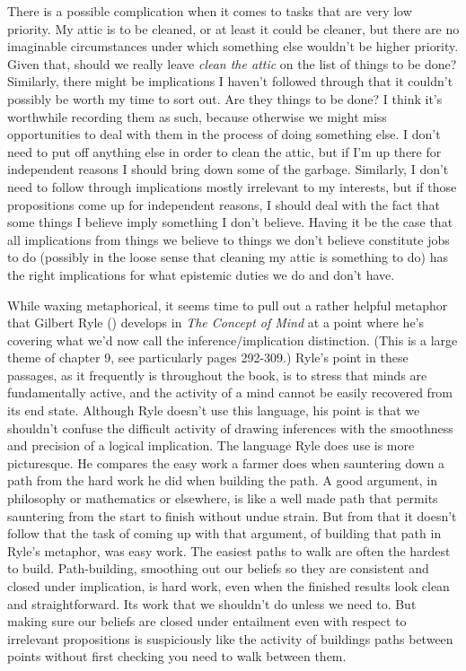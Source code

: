 \documentclass[
  11pt,
  letterpaper,
  DIV=11,
  numbers=noendperiod,
  oneside]{scrartcl}
\begin{document}
There is a possible complication when it comes to tasks that are very
low priority. My attic is to be cleaned, or at least it could be
cleaner, but there are no imaginable circumstances under which something
else wouldn't be higher priority. Given that, should we really leave
\emph{clean the attic} on the list of things to be done? Similarly,
there might be implications I haven't followed through that it couldn't
possibly be worth my time to sort out. Are they things to be done? I
think it's worthwhile recording them as such, because otherwise we might
miss opportunities to deal with them in the process of doing something
else. I don't need to put off anything else in order to clean the attic,
but if I'm up there for independent reasons I should bring down some of
the garbage. Similarly, I don't need to follow through implications
mostly irrelevant to my interests, but if those propositions come up for
independent reasons, I should deal with the fact that some things I
believe imply something I don't believe. Having it be the case that all
implications from things we believe to things we don't believe
constitute jobs to do (possibly in the loose sense that cleaning my
attic is something to do) has the right implications for what epistemic
duties we do and don't have.

While waxing metaphorical, it seems time to pull out a rather helpful
metaphor that Gilbert Ryle () develops in
\emph{The Concept of Mind} at a point where he's covering what we'd now
call the inference/implication distinction. (This is a large theme of
chapter 9, see particularly pages 292-309.) Ryle's point in these
passages, as it frequently is throughout the book, is to stress that
minds are fundamentally active, and the activity of a mind cannot be
easily recovered from its end state. Although Ryle doesn't use this
language, his point is that we shouldn't confuse the difficult activity
of drawing inferences with the smoothness and precision of a logical
implication. The language Ryle does use is more picturesque. He compares
the easy work a farmer does when sauntering down a path from the hard
work he did when building the path. A good argument, in philosophy or
mathematics or elsewhere, is like a well made path that permits
sauntering from the start to finish without undue strain. But from that
it doesn't follow that the task of coming up with that argument, of
building that path in Ryle's metaphor, was easy work. The easiest paths
to walk are often the hardest to build. Path-building, smoothing out our
beliefs so they are consistent and closed under implication, is hard
work, even when the finished results look clean and straightforward. Its
work that we shouldn't do unless we need to. But making sure our beliefs
are closed under entailment even with respect to irrelevant propositions
is suspiciously like the activity of buildings paths between points
without first checking you need to walk between them.
\end{document}
